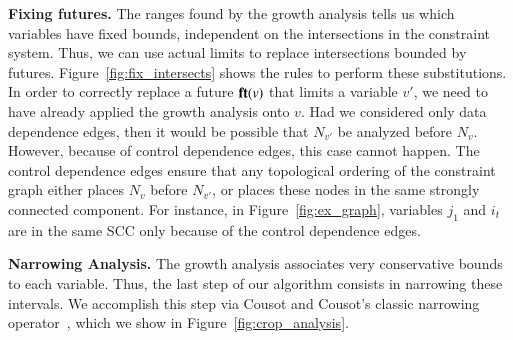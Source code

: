 \documentclass[preprint]{elsarticle}
\newcommand{\fun}[1]{\mbox{\textbf{#1}}}
\begin{document}
\noindent
\textbf{Fixing futures.}
The ranges found by the growth analysis tells us which variables have fixed
bounds, independent on the intersections in the constraint system.
Thus, we can use actual limits to replace intersections bounded by futures.
Figure~\ref{fig:fix_intersects} shows the rules to perform these substitutions.
In order to correctly replace a future $\fun{ft}(v)$ that limits a variable
$v'$, we need to have already applied the growth analysis onto $v$.
Had we considered only data dependence edges, then it would be possible
that $N_{v'}$ be analyzed before $N_v$.
However, because of control dependence edges, this case cannot happen.
The control dependence edges ensure that any topological ordering of the
constraint graph either places $N_v$ before $N_{v'}$, or places these nodes
in the same strongly connected component.
For instance, in Figure~\ref{fig:ex_graph}, variables $j_1$ and $i_t$ are in
the same SCC only because of the control dependence edges.

\noindent
\textbf{Narrowing Analysis.}
The growth analysis associates very conservative bounds to each variable.
Thus, the last step of our algorithm consists in narrowing these intervals.
We accomplish this step via Cousot and Cousot's classic narrowing
operator~\cite[p.248]{Cousot77}, which we show in
Figure~\ref{fig:crop_analysis}.
\end{document}
